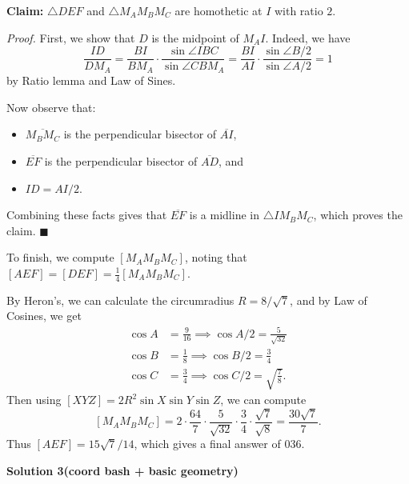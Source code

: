\begin{enumerate}
 \textbf{Claim:} $\triangle DEF$ and $\triangle M_AM_BM_C$ are homothetic at $I$ with ratio $2$. 

 \textit{Proof.} First, we show that $D$ is the midpoint of $M_AI$. Indeed, we have 
 \[\frac{ID}{DM_A} = \frac{BI}{BM_A}\cdot \frac{\sin\angle IBC}{\sin \angle CBM_A} = \frac{BI}{AI}\cdot\frac{\sin \angle B/2}{\sin \angle A/2} = 1\] by Ratio lemma and Law of Sines. 

 Now observe that:

 
            \begin{itemize}
        \item $\overline{M_BM_C}$ is the perpendicular bisector of $\overline{AI}$,
        \item $\overline{EF}$ is the perpendicular bisector of $\overline{AD}$, and
        \item $ID = AI/2$.
            \end{itemize}
            Combining these facts gives that $\overline{EF}$ is a midline in $\triangle IM_BM_C$, which proves the claim. $\blacksquare$

 To finish, we compute $[M_AM_BM_C]$, noting that $[AEF] = [DEF] = \frac{1}{4}[M_AM_BM_C]$.

 By Heron's, we can calculate the circumradius $R = 8/\sqrt{7}$, and by Law of Cosines, we get 
 \begin{align*}\cos A &= \frac{9}{16}\implies \cos A/2 = \frac{5}{\sqrt{32}} \\ \cos B &= \frac{1}{8} \implies \cos B/2 = \frac{3}{4} \\ \cos C &= \frac{3}{4} \implies \cos C/2 = \sqrt{\frac{7}{8}}.\end{align*}
Then using $[XYZ] = 2R^2\sin X\sin Y\sin Z$, we can compute 
 \[[M_AM_BM_C] = 2\cdot \frac{64}{7}\cdot \frac{5}{\sqrt{32}}\cdot \frac{3}{4}\cdot \frac{\sqrt{7}}{\sqrt{8}} = \frac{30\sqrt{7}}{7}.\]Thus $[AEF] = 15\sqrt{7}/14$, which gives a final answer of $\boxed{036}$.

 



\textbf{Solution 3(coord bash + basic geometry)}


\end{enumerate}

